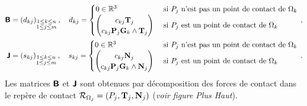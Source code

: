 \begin{align*}
    \bm{\mathsf{B}} = (d_{kj})_{\substack{1 \leq k \leq n \\ 1 \leq j \leq m}} \,, \quad d_{kj} = 
    \begin{cases}
        0 \in \mathbb{R}^3 &\text{ si } P_j \text{ n'est pas un point de contact de } \Omega_k \\
        \begin{pmatrix}
            c_{kj} \bm{\mathrm{T}}_{j} \\ c_{kj} \bm{\mathrm{P}}_j\bm{\mathrm{G}}_k \wedge \bm{\mathrm{T}}_j 
        \end{pmatrix} &\text{ si } P_j \text{ est un point de contact de } \Omega_k
    \end{cases} \,, \\
    \bm{\mathsf{J}} = (s_{kj})_{\substack{1 \leq k \leq n \\ 1 \leq j \leq m}} \,, \quad s_{kj} = 
    \begin{cases}
        0 \in \mathbb{R}^3 &\text{ si } P_j \text{ n'est pas un point de contact de } \Omega_k \\
        \begin{pmatrix}
            c_{kj} \bm{\mathrm{N}}_{j} \\ c_{kj} \bm{\mathrm{P}}_j\bm{\mathrm{G}}_k \wedge \bm{\mathrm{N}}_j 
        \end{pmatrix} &\text{ si } P_j \text{ est un point de contact de } \Omega_k
    \end{cases} \,.
\end{align*}
Les matrices $\bm{\mathsf{B}}$ et $\bm{\mathsf{J}}$ sont obtenues par décomposition des forces de contact dans le repère de contact $\mathcal{R}_{\Omega_j} = (P_j, \bm{\mathrm{T}}_j, \bm{\mathrm{N}}_j)$ (\textit{voir figure Plus Haut}).

